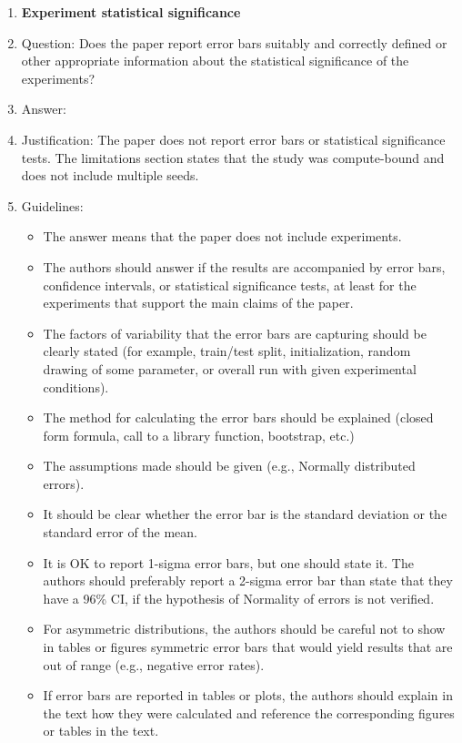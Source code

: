 \documentclass{article}
\begin{document}
\begin{enumerate}
\item {\bf Experiment statistical significance}
    \item[] Question: Does the paper report error bars suitably and correctly defined or other appropriate information about the statistical significance of the experiments?
    \item[] Answer: \answerNo{} %
    \item[] Justification: The paper does not report error bars or statistical significance tests. The limitations section states that the study was compute-bound and does not include multiple seeds.
    \item[] Guidelines:
    \begin{itemize}
        \item The answer \answerNA{} means that the paper does not include experiments.
        \item The authors should answer \answerYes{} if the results are accompanied by error bars, confidence intervals, or statistical significance tests, at least for the experiments that support the main claims of the paper.
        \item The factors of variability that the error bars are capturing should be clearly stated (for example, train/test split, initialization, random drawing of some parameter, or overall run with given experimental conditions).
        \item The method for calculating the error bars should be explained (closed form formula, call to a library function, bootstrap, etc.)
        \item The assumptions made should be given (e.g., Normally distributed errors).
        \item It should be clear whether the error bar is the standard deviation or the standard error of the mean.
        \item It is OK to report 1-sigma error bars, but one should state it. The authors should preferably report a 2-sigma error bar than state that they have a 96\% CI, if the hypothesis of Normality of errors is not verified.
        \item For asymmetric distributions, the authors should be careful not to show in tables or figures symmetric error bars that would yield results that are out of range (e.g., negative error rates).
        \item If error bars are reported in tables or plots, the authors should explain in the text how they were calculated and reference the corresponding figures or tables in the text.
    \end{itemize}


\end{enumerate}
\end{document}
